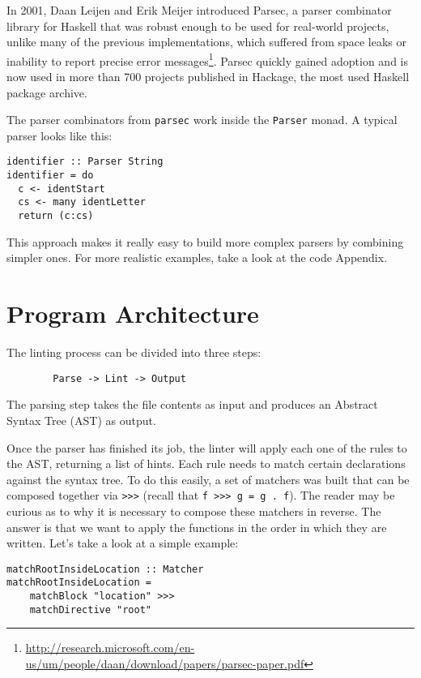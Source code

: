 \documentclass[]{article}
\begin{document}
In 2001, Daan Leijen and Erik Meijer introduced Parsec, a parser combinator
library for Haskell that was robust enough to be used for real-world projects,
unlike many of the previous implementations, which suffered from space leaks
or inability to report precise error messages\footnote{\url{http://research.microsoft.com/en-us/um/people/daan/download/papers/parsec-paper.pdf}}.
Parsec quickly gained adoption and is now used in more than 700 projects
published in Hackage, the most used Haskell package archive.

The parser combinators from \texttt{parsec} work inside the \texttt{Parser} monad.
A typical parser looks like this:

\begin{lstlisting}[basicstyle=\ttfamily]
identifier :: Parser String
identifier = do
  c <- identStart
  cs <- many identLetter
  return (c:cs)
\end{lstlisting}

This approach makes it really easy to build more complex parsers by combining
simpler ones. For more realistic examples, take a look at the code Appendix.

\section{Program Architecture}\label{program-architecture}

The linting process can be divided into three steps:

\begin{verbatim}
        Parse -> Lint -> Output
\end{verbatim}

The parsing step takes the file contents as input and produces an
Abstract Syntax Tree (AST) as output.

Once the parser has finished its job, the linter will apply each one of
the rules to the AST, returning a list of hints. Each rule needs to
match certain declarations against the syntax tree. To do this easily, a
set of matchers was built that can be composed together via
\texttt{\textgreater{}\textgreater{}\textgreater{}} (recall that
\texttt{f\ \textgreater{}\textgreater{}\textgreater{}\ g\ =\ g\ .\ f}).
The reader may be curious as to why it is necessary to compose these matchers
in reverse. The answer is that we want to apply the functions in the order in
which they are written. Let's take a look at a simple example:

\begin{minipage}{\linewidth}
\begin{lstlisting}[basicstyle=\ttfamily]
matchRootInsideLocation :: Matcher
matchRootInsideLocation =
    matchBlock "location" >>>
    matchDirective "root"
\end{lstlisting}
\end{minipage}
\end{document}
